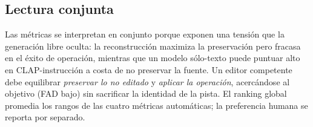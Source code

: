 \subsection{Lectura conjunta}
\label{sec:edit:lectura}

Las métricas se interpretan en conjunto porque exponen una tensión que la
generación libre oculta: la reconstrucción maximiza la preservación pero
fracasa en el éxito de operación, mientras que un modelo sólo-texto puede
puntuar alto en CLAP-instrucción a costa de no preservar la fuente. Un editor
competente debe equilibrar \emph{preservar lo no editado} y \emph{aplicar la
operación}, acercándose al objetivo (FAD bajo) sin sacrificar la identidad de
la pista. El ranking global promedia los rangos de las cuatro métricas
automáticas; la preferencia humana se reporta por separado.

